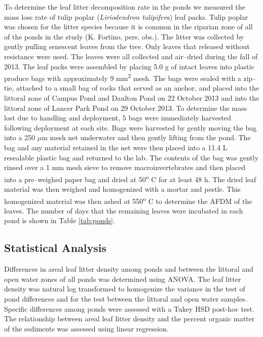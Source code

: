 \documentclass{article}
\begin{document}
To determine the leaf litter decomposition rate in the ponds we measured the mass loss rate of tulip poplar (\emph{Liriodendron tulipifera}) leaf packs. Tulip poplar was chosen for the litter species because it is common in the riparian zone of all of the ponds in the study (K. Fortino, pers. obs.).  The litter was collected by gently pulling senescent leaves from the tree. Only leaves that released without resistance were used.  The leaves were all collected and air--dried during the fall of 2013.  The leaf packs were assembled by placing 5.0 g of intact leaves into plastic produce bags with approximately 9 mm\textsuperscript{2} mesh. The bags were sealed with a zip--tie, attached to a small bag of rocks that served as an anchor, and placed into the littoral zone of Campus Pond and Daulton Pond on 22 October 2013 and into the littoral zone of Lancer Park Pond on 29 October 2013. To determine the mass lost due to handling and deployment, 5 bags were immediately harvested following deployment at each site. Bags were harvested by gently moving the bag into a 250 $\mu$m mesh net underwater and then gently lifting from the pond. The bag and any material retained in the net were then placed into a 11.4 L resealable plastic bag and returned to the lab.  The contents of the bag was gently rinsed over a 1 mm mesh sieve to remove macroinvertebrates and then placed into a pre--weighed paper bag and dried at 50\textsuperscript{o} C for at least 48 h.  The dried leaf material was then weighed and homogenized with a mortar and pestle. This homogenized material was then ashed at 550\textsuperscript{o} C to determine the AFDM of the leaves. The number of days that the remaining leaves were incubated in each pond is shown in Table \ref{tab:ponds}. 

\subsection{Statistical Analysis}

Differences in areal leaf litter density among ponds and between the littoral and open water zones of all ponds was determined using ANOVA. The leaf litter density was natural log transformed to homogenize the variance in the test of pond differences and for the test between the littoral and open water samples. Specific differences among ponds were assessed with a Tukey HSD post-hoc test. The relationship between areal leaf litter density and the percent organic matter of the sediments was assessed using linear regression.
\end{document}
